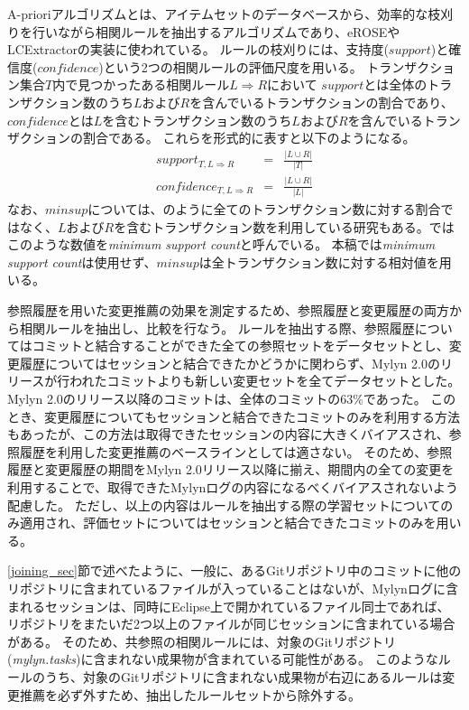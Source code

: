 \documentclass[a4paper]{jsbook}
\def\Ra{\Rightarrow}
\newcommand{\confidence}{con\!f\!idence}
\begin{document}
A-prioriアルゴリズム\cite{Bondugula:2006}とは、アイテムセットのデータベースから、効率的な枝刈りを行いながら相関ルールを抽出するアルゴリズムであり、eROSEやLCExtractorの実装に使われている。
ルールの枝刈りには、支持度($support$)と確信度($\confidence$)という2つの相関ルールの評価尺度を用いる。
トランザクション集合$T$内で見つかったある相関ルール$L \Ra R$において
$support$とは全体のトランザクション数のうち$L$および$R$を含んでいるトランザクションの割合であり、
$\confidence$とは$L$を含むトランザクション数のうち$L$および$R$を含んでいるトランザクションの割合である。
これらを形式的に表すと以下のようになる。
\begin{eqnarray}
  support_{T,L \Ra R} &=& \frac{| L \cup R |}{|T|}\\
  \confidence_{T,L \Ra R} &=& \frac{| L \cup R |}{|L|}
\end{eqnarray}
なお、$minsup$については、\cite{Zimmermann:2005}のように全てのトランザクション数に対する割合ではなく、$L$および$R$を含むトランザクション数を利用している研究もある。\cite{Zimmermann:2005}ではこのような数値を{\it minimum support count}と呼んでいる。
本稿では{\it minimum support count}は使用せず、$minsup$は全トランザクション数に対する相対値を用いる。

参照履歴を用いた変更推薦の効果を測定するため、参照履歴と変更履歴の両方から相関ルールを抽出し、比較を行なう。
ルールを抽出する際、参照履歴についてはコミットと結合することができた全ての参照セットをデータセットとし、変更履歴についてはセッションと結合できたかどうかに関わらず、Mylyn 2.0のリリースが行われたコミットよりも新しい変更セットを全てデータセットとした。
Mylyn 2.0のリリース以降のコミットは、全体のコミットの63\%であった。
このとき、変更履歴についてもセッションと結合できたコミットのみを利用する方法もあったが、この方法は取得できたセッションの内容に大きくバイアスされ、参照履歴を利用した変更推薦のベースラインとしては適さない。
そのため、参照履歴と変更履歴の期間をMylyn 2.0リリース以降に揃え、期間内の全ての変更を利用することで、取得できたMylynログの内容になるべくバイアスされないよう配慮した。
ただし、以上の内容はルールを抽出する際の学習セットについてのみ適用され、評価セットについてはセッションと結合できたコミットのみを用いる。

\ref{joining_sec}節で述べたように、一般に、あるGitリポジトリ中のコミットに他のリポジトリに含まれているファイルが入っていることはないが、Mylynログに含まれるセッションは、同時にEclipse上で開かれているファイル同士であれば、リポジトリをまたいだ2つ以上のファイルが同じセッションに含まれている場合がある。
そのため、共参照の相関ルールには、対象のGitリポジトリ({\it mylyn.tasks})に含まれない成果物が含まれている可能性がある。
このようなルールのうち、対象のGitリポジトリに含まれない成果物が右辺にあるルールは変更推薦を必ず外すため、抽出したルールセットから除外する。
\end{document}
